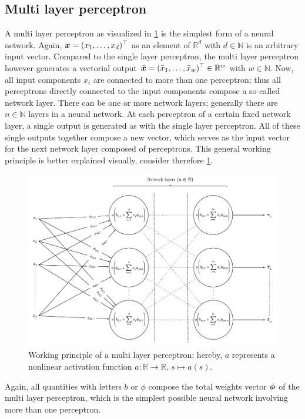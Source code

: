 \documentclass[a4paper,11pt]{report}
\begin{document}
\subsection{Multi layer perceptron}
A multi layer perceptron as visualized in \cref{fig:MLP} is the simplest form of a neural network. Again, $\bm{x} = (x_1, \dots, x_d)^\top$ as an element of $\mathbb{R}^d$ with $d \in \mathbb{N}$ is an arbitrary input vector. Compared to the single layer perceptron, the multi layer perceptron however generates a vectorial output $\bar{\bm{x}} = (\bar{x}_1,\dots,\bar{x}_w)^\top \in \mathbb{R}^w$ with $w \in \mathbb{N}$. Now, all input components $x_i$ are connected to more than one perceptron; thus all perceptrons directly connected to the input components compose a so-called network layer. There can be one or more network layers; generally there are $n\in \mathbb{N}$ layers in a neural network. At each perceptron of a certain fixed network layer, a single output is generated as with the single layer perceptron. All of these single outputs together compose a new vector, which serves as the input vector for the next network layer composed of perceptrons. This general working principle is better explained visually, consider therefore \cref{fig:MLP}.
\begin{figure}[h!]
\centering
\includegraphics[width=\textwidth]{figures/MLP.pdf}
\caption{Working principle of a multi layer perceptron; hereby, $a$ represents a nonlinear activation function $a :\mathbb{R}\rightarrow \mathbb{R},\, s\mapsto a(s)$.}
\label{fig:MLP}
\end{figure}
Again, all quantities with letters $b$ or $\phi$ compose the total weights vector $\bm{\phi}$ of the multi layer perceptron, which is the simplest possible neural network involving more than one perceptron.
\end{document}
